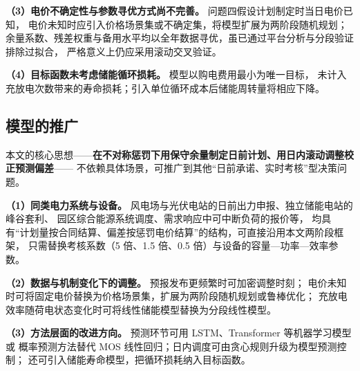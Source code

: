 \textbf{（3）电价不确定性与参数寻优方式尚不完善。} 问题四假设计划制定时当日电价已知，
电价未知时应引入价格场景集或不确定集，将模型扩展为两阶段随机规划；
余量系数、残差权重与备用水平均以全年数据寻优，虽已通过平台分析与分段验证排除过拟合，
严格意义上仍应采用滚动交叉验证。

\textbf{（4）目标函数未考虑储能循环损耗。} 模型以购电费用最小为唯一目标，
未计入充放电次数带来的寿命损耗；引入单位循环成本后储能周转量将相应下降。

\subsection{模型的推广}
本文的核心思想——\textbf{在不对称惩罚下用保守余量制定日前计划、用日内滚动调整校正预测偏差}——
不依赖具体场景，可推广到其他“日前承诺、实时考核”型决策问题。

\textbf{（1）同类电力系统与设备。} 风电场与光伏电站的日前出力申报、独立储能电站的峰谷套利、
园区综合能源系统调度、需求响应中可中断负荷的报价等，
均具有“计划量按合同结算、偏差按惩罚电价结算”的结构，可直接沿用本文两阶段框架，
只需替换考核系数（5 倍、1.5 倍、0.5 倍）与设备的容量—功率—效率参数。

\textbf{（2）数据与机制变化下的调整。} 预报发布更频繁时可加密调整时刻；
电价未知时可将固定电价替换为价格场景集，扩展为两阶段随机规划或鲁棒优化；
充放电效率随荷电状态变化时可将线性储能模型替换为分段线性模型。

\textbf{（3）方法层面的改进方向。} 预测环节可用 LSTM、Transformer 等机器学习模型或
概率预测方法\cite{hong2016}替代 MOS 线性回归；日内调度可由贪心规则升级为模型预测控制；
还可引入储能寿命模型，把循环损耗纳入目标函数。
